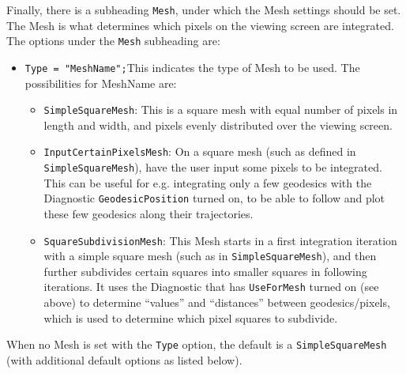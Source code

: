 \documentclass[11pt,a4paper]{article}
\newcommand{\code}[1]{{\tt #1}}
\begin{document}
Finally, there is a subheading \code{Mesh}, under which the Mesh settings should be set. The Mesh is what determines which pixels on the viewing screen are integrated. The options under the \code{Mesh} subheading are:
\begin{itemize}
 \item \code{Type = "MeshName";}\newline This indicates the type of Mesh to be used. The possibilities for MeshName are:
 \begin{itemize}
 \item \code{SimpleSquareMesh}: This is a square mesh with equal number of pixels in length and width, and pixels evenly distributed over the viewing screen.
 \item \code{InputCertainPixelsMesh}: On a square mesh (such as defined in \code{SimpleSquareMesh}), have the user input some pixels to be integrated. This can be useful for e.g. integrating only a few geodesics with the Diagnostic \code{GeodesicPosition} turned on, to be able to follow and plot these few geodesics along their trajectories.
 \item \code{SquareSubdivisionMesh}: This Mesh starts in a first integration iteration with a simple square mesh (such as in \code{SimpleSquareMesh}), and then further subdivides certain squares into smaller squares in following iterations. It uses the Diagnostic that has \code{UseForMesh} turned on (see above) to determine ``values'' and ``distances'' between geodesics/pixels, which is used to determine which pixel squares to subdivide.
\end{itemize}
\end{itemize}
When no Mesh is set with the \code{Type} option, the default is a \code{SimpleSquareMesh} (with additional default options as listed below).
\end{document}
